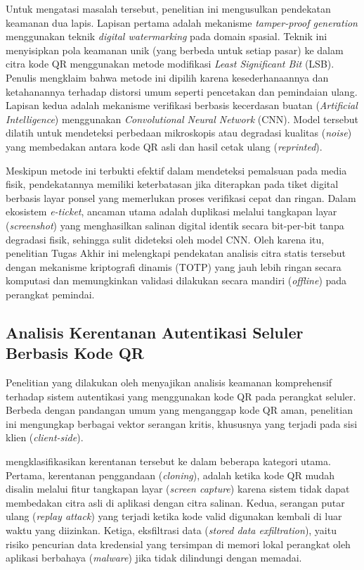 Untuk mengatasi masalah tersebut, penelitian ini mengusulkan pendekatan keamanan dua lapis. Lapisan pertama adalah mekanisme \textit{tamper-proof generation} menggunakan teknik \textit{digital watermarking} pada domain spasial. Teknik ini menyisipkan pola keamanan unik (yang berbeda untuk setiap pasar) ke dalam citra kode QR menggunakan metode modifikasi \textit{Least Significant Bit} (LSB). Penulis mengklaim bahwa metode ini dipilih karena kesederhanaannya dan ketahanannya terhadap distorsi umum seperti pencetakan dan pemindaian ulang. Lapisan kedua adalah mekanisme verifikasi berbasis kecerdasan buatan (\textit{Artificial Intelligence}) menggunakan \textit{Convolutional Neural Network} (CNN). Model tersebut dilatih untuk mendeteksi perbedaan mikroskopis atau degradasi kualitas (\textit{noise}) yang membedakan antara kode QR asli dan hasil cetak ulang (\textit{reprinted}).

Meskipun metode ini terbukti efektif dalam mendeteksi pemalsuan pada media fisik, pendekatannya memiliki keterbatasan jika diterapkan pada tiket digital berbasis layar ponsel yang memerlukan proses verifikasi cepat dan ringan. Dalam ekosistem \textit{e-ticket}, ancaman utama adalah duplikasi melalui tangkapan layar (\textit{screenshot}) yang menghasilkan salinan digital identik secara bit-per-bit tanpa degradasi fisik, sehingga sulit dideteksi oleh model CNN. Oleh karena itu, penelitian Tugas Akhir ini melengkapi pendekatan analisis citra statis tersebut dengan mekanisme kriptografi dinamis (TOTP) yang jauh lebih ringan secara komputasi dan memungkinkan validasi dilakukan secara mandiri (\textit{offline}) pada perangkat pemindai.

\subsection{Analisis Kerentanan Autentikasi Seluler Berbasis Kode QR}
Penelitian yang dilakukan oleh \textcite{sung2015security} menyajikan analisis keamanan komprehensif terhadap sistem autentikasi yang menggunakan kode QR pada perangkat seluler. Berbeda dengan pandangan umum yang menganggap kode QR aman, penelitian ini mengungkap berbagai vektor serangan kritis, khususnya yang terjadi pada sisi klien (\textit{client-side}).

\textcite{sung2015security} mengklasifikasikan kerentanan tersebut ke dalam beberapa kategori utama. Pertama, kerentanan penggandaan (\textit{cloning}), adalah ketika kode QR mudah disalin melalui fitur tangkapan layar (\textit{screen capture}) karena sistem tidak dapat membedakan citra asli di aplikasi dengan citra salinan. Kedua, serangan putar ulang (\textit{replay attack}) yang terjadi ketika kode valid digunakan kembali di luar waktu yang diizinkan. Ketiga, eksfiltrasi data (\textit{stored data exfiltration}), yaitu risiko pencurian data kredensial yang tersimpan di memori lokal perangkat oleh aplikasi berbahaya (\textit{malware}) jika tidak dilindungi dengan memadai.

